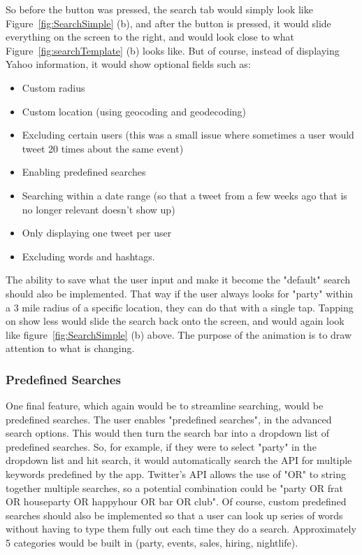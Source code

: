 \documentclass[11pt]{article}
\begin{document}
So before the button was pressed, the search tab would simply look like Figure~\ref{fig:SearchSimple} (b), and after the button is pressed, it would slide everything on the screen to the right, and would look close to what Figure~\ref{fig:searchTemplate} (b) looks like. But of course, instead of displaying Yahoo information, it would show optional fields such as: 

\begin{itemize}
\item Custom radius
\item Custom location (using geocoding and geodecoding)
\item Excluding certain users (this was a small issue where sometimes a user would tweet 20 times about the same event) 
\item Enabling predefined searches
\item Searching within a date range (so that a tweet from a few weeks ago that is no longer relevant doesn't show up)
\item Only displaying one tweet per user
\item Excluding words and hashtags. 
\end{itemize}

The ability to save what the user input and make it become the "default" search should also be implemented. That way if the user always looks for "party" within a 3 mile radius of a specific location, they can do that with a single tap. Tapping on show less would slide the search back onto the screen, and would again look like figure~\ref{fig:SearchSimple} (b) above. The purpose of the animation is to draw attention to what is changing. 

\subsubsection{Predefined Searches}

One final feature, which again would be to streamline searching, would be predefined searches. The user enables "predefined searches", in the advanced search options. This would then turn the search bar into a dropdown list of predefined searches. So, for example, if they were to select "party" in the dropdown list and hit search, it would automatically search the API for multiple keywords predefined by the app. Twitter's API allows the use of "OR" to string together multiple searches, so a potential combination could be "party OR frat OR houseparty OR happyhour OR bar OR club". Of course, custom predefined searches should also be implemented so that a user can look up series of words without having to type them fully out each time they do a search. Approximately 5 categories would be built in (party, events, sales, hiring, nightlife).
\end{document}
